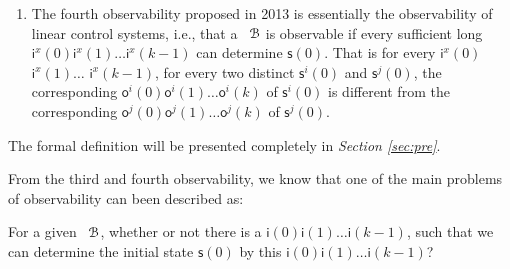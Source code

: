 \begin{enumerate}
	\item  The fourth observability proposed in 2013 \cite{Fornasini2013Observability} is essentially the observability of linear control systems, i.e., that a \BCN\ ${\mathcal{B}}$ is observable if every sufficient long $\mathsf{i}^{x}(0)$$\mathsf{i}^{x}(1)\ldots$$\mathsf{i}^{x}(k-1)$ can determine $\mathsf{s}(0)$. That is for every $\mathsf{i}^{x}(0)$$\mathsf{i}^{x}(1)\ldots$ $\mathsf{i}^{x}(k-1)$, for every two distinct $\mathsf{s}^{i}(0)$ and $\mathsf{s}^{j}(0)$, the corresponding $\mathsf{o}^{i}(0)$$\mathsf{o}^{i}(1)\ldots$$\mathsf{o}^{i}(k)$ of $\mathsf{s}^{i}(0)$ is different from the corresponding $\mathsf{o}^{j}(0)$$\mathsf{o}^{j}(1)\ldots$$\mathsf{o}^{j}(k)$ of $\mathsf{s}^{j}(0)$.%
\end{enumerate}
 The formal definition will be presented completely in {\em Section \ref{sec:pre}}.
 
 From the third and fourth observability, we know that one of the main problems of observability can been described as: 
\begin{problem}
\label{pro:1}
For a given \BCN\ ${\mathcal{B}}$, whether or not there is a $\mathsf{i}(0)\mathsf{i}(1)\ldots\mathsf{i}(k-1)$, such that we can determine the initial state $\mathsf{s}(0)$ by this $\mathsf{i}(0)\mathsf{i}(1)\ldots\mathsf{i}(k-1)$?
\end{problem}

